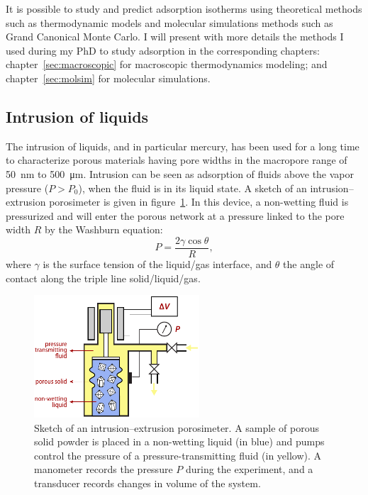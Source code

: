 \documentclass[thesis]{subfiles}
\begin{document}
It is possible to study and predict adsorption isotherms using theoretical
methods such as thermodynamic models and molecular simulations methods such as
Grand Canonical Monte Carlo. I will present with more details the methods I used
during my PhD to study adsorption in the corresponding chapters:
chapter~\ref{sec:macroscopic} for macroscopic thermodynamics modeling; and
chapter~\ref{sec:molsim} for molecular simulations.

\subsection{Intrusion of liquids}

The intrusion of liquids, and in particular mercury, has been used for a long
time to characterize porous materials having pore widths in the macropore range
of \SI{50}{nm} to \SI{500}{\um}\cite{Rouquerol2011}. Intrusion can be seen as
adsorption of fluids above the vapor pressure ($P > P_0$), \ie when the fluid is
in its liquid state. A sketch of an intrusion--extrusion porosimeter is given in
figure~\ref{fig:porosimeter}. In this device, a non-wetting fluid is pressurized
and will enter the porous network at a pressure linked to the pore width $R$ by
the Washburn equation\cite{Fraux2017-2}:
\[P = \frac{2\gamma\cos\theta}{R},\]
where $\gamma$ is the surface tension of the liquid/gas interface, and $\theta$
the angle of contact along the triple line solid/liquid/gas.

\begin{figure}[htb]
    \centering
    \includegraphics[width=0.55\textwidth]{figures/images/porosimeter}
    \caption{Sketch of an intrusion--extrusion porosimeter. A sample of porous
    solid powder is placed in a non-wetting liquid (in blue) and pumps control
    the pressure of a pressure-transmitting fluid (in yellow). A manometer
    records the pressure $P$ during the experiment, and a transducer records
    changes in volume of the system.}
  \label{fig:porosimeter}
\end{figure}
\end{document}

